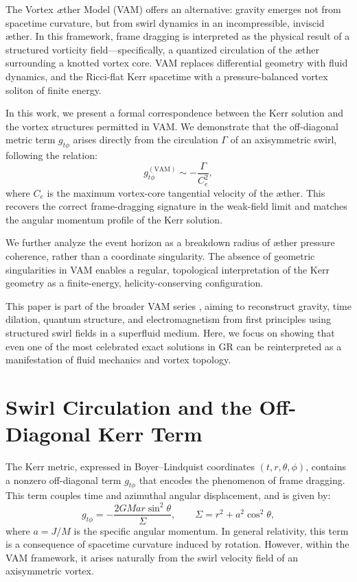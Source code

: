 \documentclass[twocolumn,aps,pre,floatfix,nofootinbib]{revtex4-2}
\begin{document}
    The Vortex \textit{\ae}ther Model (VAM) \cite{VAM-0,VAM-1,VAM-2} offers an alternative: gravity emerges not from spacetime curvature, but from swirl dynamics in an incompressible, inviscid æther. In this framework, frame dragging is interpreted as the physical result of a structured vorticity field—specifically, a quantized circulation of the æther surrounding a knotted vortex core. VAM replaces differential geometry with fluid dynamics, and the Ricci-flat Kerr spacetime with a pressure-balanced vortex soliton of finite energy.

    In this work, we present a formal correspondence between the Kerr solution and the vortex structures permitted in VAM. We demonstrate that the off-diagonal metric term \( g_{t\phi} \) arises directly from the circulation \( \Gamma \) of an axisymmetric swirl, following the relation:
    \[
        g_{t\phi}^{(\text{VAM})} \sim -\frac{\Gamma}{C_e^2},
    \]
    where \( C_e \) is the maximum vortex-core tangential velocity of the æther. This recovers the correct frame-dragging signature in the weak-field limit and matches the angular momentum profile of the Kerr solution.

    We further analyze the event horizon as a breakdown radius of æther pressure coherence, rather than a coordinate singularity. The absence of geometric singularities in VAM enables a regular, topological interpretation of the Kerr geometry as a finite-energy, helicity-conserving configuration.

    This paper is part of the broader VAM series \cite{VAM-0,VAM-1,VAM-2,VAM-4,VAM-5,VAM-6}, aiming to reconstruct gravity, time dilation, quantum structure, and electromagnetism from first principles using structured swirl fields in a superfluid medium. Here, we focus on showing that even one of the most celebrated exact solutions in GR can be reinterpreted as a manifestation of fluid mechanics and vortex topology.





    \section{Swirl Circulation and the Off-Diagonal Kerr Term}

    The Kerr metric, expressed in Boyer--Lindquist coordinates $(t, r, \theta, \phi)$, contains a nonzero off-diagonal term $g_{t\phi}$ that encodes the phenomenon of frame dragging. This term couples time and azimuthal angular displacement, and is given by:
    \begin{equation}
        g_{t\phi} = -\frac{2 G M a r \sin^2\theta}{\Sigma}, \qquad \Sigma = r^2 + a^2 \cos^2\theta,
    \end{equation}
    where $a = J/M$ is the specific angular momentum. In general relativity, this term is a consequence of spacetime curvature induced by rotation. However, within the VAM framework, it arises naturally from the swirl velocity field of an axisymmetric vortex.
\end{document}
